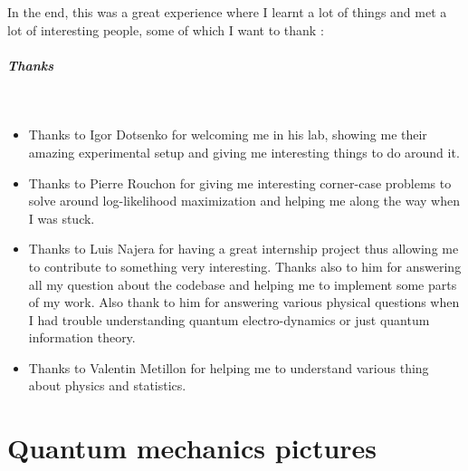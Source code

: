 \documentclass[10pt,a4paper]{report}
\theoremstyle{plain}
\theoremstyle{definition}
\theoremstyle{remark}
\begin{document}
In the end, this was a great experience where I learnt a lot of things and met a lot
of interesting people, some of which I want to thank :

\vfill

\paragraph{\Huge Thanks}

\

\vspace{1.3cm}

\begin{itemize}

\item Thanks to Igor Dotsenko for welcoming me in his lab, showing me their
  amazing experimental setup and giving me interesting things to do around it.\\
\item Thanks to Pierre Rouchon for giving me interesting corner-case problems to solve
  around log-likelihood maximization and helping me along the way when I was stuck.\\
\item Thanks to Luis Najera for having a great internship project thus allowing
  me to contribute to something very interesting. Thanks also to
  him for answering all my question about the codebase and helping me to
  implement some parts of my work. Also thank to him for answering various
  physical questions when I had trouble understanding quantum electro-dynamics or
  just quantum information theory.\\
\item Thanks to Valentin Metillon for helping me to understand various thing
  about physics and statistics.
\end{itemize}


\vfill








\appendix

\chapter{Quantum mechanics pictures}\label{app:pict}
\end{document}
